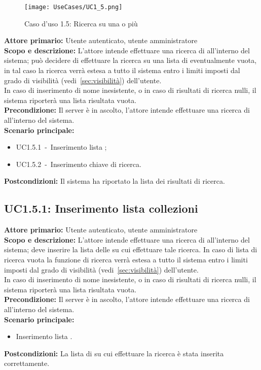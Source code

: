 \documentclass{scalatekids-article}
\begin{document}
\begin{figure}[H]
  \begin{center}
    \texttt{[image: UseCases/UC1\_5.png]}
    \caption*{Caso d'uso 1.5: Ricerca su una o più }
  \end{center}
\end{figure}
\textbf{Attore primario:} Utente autenticato, utente amministratore\\
\textbf{Scopo e descrizione:} L'attore intende effettuare una ricerca di  all'interno del sistema; può decidere di effettuare la ricerca su una lista di  eventualmente vuota, in tal caso la
ricerca verrà estesa a tutto il sistema entro i limiti imposti dal grado di visibilità (vedi~\ref{sec:visibilità}) dell'utente.\\
In caso di inserimento di nome  inesistente, o in caso di risultati di ricerca nulli, il sistema riporterà una lista risultata vuota.\\ %
\textbf{Precondizione:} Il server è in ascolto, l'attore intende effettuare una ricerca di  all'interno del sistema.\\
\textbf{Scenario principale:}
\begin{itemize}
\item UC1.5.1\ -\ Inserimento lista ;
\item UC1.5.2\ -\ Inserimento chiave di ricerca.
\end{itemize}
\textbf{Postcondizioni:} Il sistema ha riportato la lista dei risultati di ricerca.

\subsection{UC1.5.1: Inserimento lista collezioni}

\textbf{Attore primario:} Utente autenticato, utente amministratore\\
\textbf{Scopo e descrizione:} L'attore intende effettuare una ricerca di  all'interno del sistema; deve inserire la lista delle  su cui effettuare tale ricerca. In caso di lista di ricerca vuota
la funzione di ricerca verrà estesa a tutto il sistema entro i limiti imposti dal grado di visibilità (vedi~\ref{sec:visibilità}) dell'utente.\\
In caso di inserimento di nome  inesistente, o in caso di risultati di ricerca nulli, il sistema riporterà una lista risultata vuota.\\ %
\textbf{Precondizione:} Il server è in ascolto, l'attore intende effettuare una ricerca di  all'interno del  sistema.\\
\textbf{Scenario principale:}
\begin{itemize}
\item Inserimento lista .
\end{itemize}
\textbf{Postcondizioni:} La lista di  su cui effettuare la ricerca è stata inserita correttamente.
\end{document}
